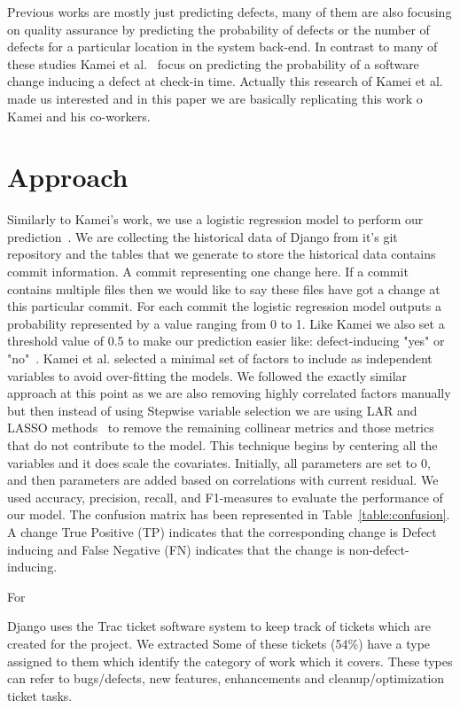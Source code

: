 \documentclass[10pt, conference]{IEEEtran}
\begin{document}
Previous works are mostly just predicting defects, many of them are also focusing on quality assurance by predicting the probability of defects or the number of defects for a particular location in the system back-end. In contrast to many of these studies Kamei et al.~\cite{Kamei2013TSE} focus on predicting the probability of a software change inducing a defect at check-in time. Actually this research of Kamei et al. made us interested and in this paper we are basically replicating this work o Kamei and his co-workers.

\section{Approach}
\label{sec:approach}



Similarly to Kamei's work, we use a logistic regression model to perform our prediction~\cite{Kamei2013TSE}. We are collecting the historical data of Django from it's git repository and the tables that we generate to store the historical data contains commit information. A commit representing one change here. If a commit contains multiple files then we would like to say these files have got a change at this particular commit. For each commit the logistic regression model outputs a probability represented by a value ranging from 0 to 1. Like Kamei we also set a threshold value of 0.5 to make our prediction easier like: defect-inducing "yes" or "no"~\cite{Gyimothy2005TSE,Guo2010ICSE}.
Kamei et al. selected a minimal set of factors to include as independent variables to avoid over-fitting the models. We followed the exactly similar approach at this point as we are also removing highly correlated factors manually but then instead of using Stepwise variable selection we are using LAR and LASSO methods~\cite{Flom2007NESUG} to remove the remaining collinear metrics and those metrics that do not contribute to the model. This technique begins by centering all the variables and it does scale the covariates. Initially, all parameters are set to 0, and then parameters are added based on correlations with current residual. 
We used accuracy, precision, recall, and F1-measures to evaluate the performance of our model. The confusion matrix has been represented in Table~\ref{table:confusion}. A change True Positive (TP) indicates that the corresponding change is Defect inducing and False Negative (FN) indicates that the change is non-defect-inducing.

For 

Django uses the Trac ticket software system to keep track of tickets which are created for the project. We extracted Some of these tickets (54\%) have a type assigned to them which identify the category of work which it covers. These types can refer to bugs/defects, new features, enhancements and cleanup/optimization ticket tasks. 
\end{document}
